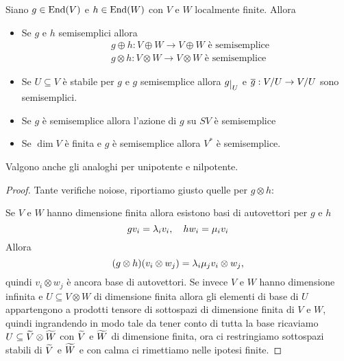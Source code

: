 \begin{lemma}\label{LmPassaggioSemisempliceUnipotenteNilpotenteAdOperazioniVettoriali}
Siano $g\in\operatorname{End}(V)$ e $h\in\operatorname{End}(W)$ con $V$ e $W$ localmente finite. Allora
\begin{itemize}
    \item Se $g$ e $h$ semisemplici allora
    \begin{align*}
    &g\oplus h:V\oplus W\to V\oplus W\text{ \`e semisemplice}\\
    &g\otimes h:V\otimes W\to V\otimes W\text{ \`e semisemplice}
    \end{align*}
    \item Se $U\subseteq V$ \`e stabile per $g$ e $g$ semisemplice allora $g\res U$ e $\overline{g}:V/U\to V/U$ sono semisemplici.
    \item Se $g$ \`e semisemplice allora l'azione di $g$ su $SV$ \`e semisemplice
    \item Se $\dim V$ \`e finita e $g$ \`e semisemplice allora $V^\ast$ \`e semisemplice.
\end{itemize}
Valgono anche gli analoghi per unipotente e nilpotente.
\end{lemma}
\begin{proof}
Tante verifiche noiose, riportiamo giusto quelle per $g\otimes h$:

Se $V$ e $W$ hanno dimensione finita allora esistono basi di autovettori per $g$ e $h$
\[gv_i=\lambda_iv_i,\quad hw_i=\mu_iv_i\]
Allora
\[(g\otimes h)(v_i\otimes w_j)=\lambda_i\mu_j v_i\otimes w_j,\]
quindi $v_i\otimes w_j$ \`e ancora base di autovettori.
Se invece $V$ e $W$ hanno dimensione infinita e $U\subseteq V\otimes W$ di dimensione finita allora gli elementi di base di $U$ appartengono a prodotti tensore di sottospazi di dimensione finita di $V$ e $W$, quindi ingrandendo in modo tale da tener conto di tutta la base ricaviamo $U\subseteq \widetilde{V}\otimes \widetilde{W}$ con $\widetilde{V}$ e $\widetilde{W}$ di dimensione finita, ora ci restringiamo  sottospazi stabili di $\widetilde{V}$ e $\widetilde{W}$ e con calma ci rimettiamo nelle ipotesi finite.
\end{proof}

